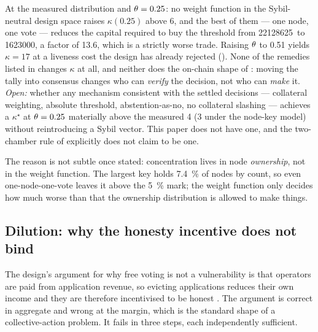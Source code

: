 \begin{openproblem}
\label{op:23:negative}
At the measured distribution and $\theta = 0.25$: no weight function in the Sybil-neutral design
space raises $\kappa(0.25)$ above 6, and the best of them --- one node, one vote --- reduces the
capital required to buy the threshold from \num{22128625}\flux\ to \num{1623000}\flux, a factor of
\num{13.6}, which is a strictly worse trade. Raising $\theta$ to \num{0.51} yields
$\kappa = 17$ at a liveness cost the design has already rejected (). None of
the remedies listed in  changes $\kappa$ at all, and neither does the on-chain
shape of : moving the tally into consensus changes who can \emph{verify} the
decision, not who can \emph{make} it. \emph{Open:} whether any
mechanism consistent with the settled decisions --- collateral weighting, absolute threshold,
abstention-as-no, no collateral slashing --- achieves a $\kappa^{\star}$ at $\theta = 0.25$
materially above the measured 4 (3 under the node-key model)
without reintroducing a Sybil vector. This paper does not have one, and the two-chamber rule of
 explicitly does not claim to be one.
\end{openproblem}

The reason is not subtle once stated: concentration lives in node \emph{ownership}, not in the
weight function. The largest key holds \SI{7.4}{\percent} of nodes by count, so even one-node-one-vote
leaves it above the \SI{5}{\percent} mark; the weight function only decides how much worse than
that the ownership distribution is allowed to make things.

\subsection{Dilution: why the honesty incentive does not bind}
\label{sec:23:dilution}

The design's argument for why free voting is not a vulnerability is that operators are paid from
application revenue, so evicting applications reduces their own income and they are therefore
incentivised to be honest . The argument is correct in
aggregate and wrong at the margin, which is the standard shape of a collective-action problem. It
fails in three steps, each independently sufficient.

